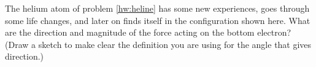         The helium atom of problem \ref{hw:heline} has some new experiences,
        goes through some life changes, and later on finds itself in
        the configuration shown here.  What are the direction and
        magnitude of the force acting on the bottom electron?  (Draw
        a sketch to make clear the definition you are using for the
        angle that gives direction.)\answercheck
